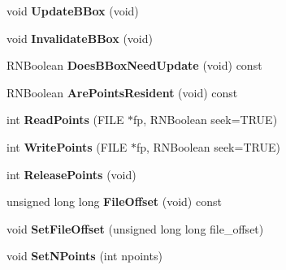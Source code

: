 \begin{DoxyCompactItemize}
\item 
void {\bfseries Update\+B\+Box} (void)\hypertarget{class_g_s_v_scanline_a765a0175e7e921746ac149bc28713080}{}\label{class_g_s_v_scanline_a765a0175e7e921746ac149bc28713080}

\item 
void {\bfseries Invalidate\+B\+Box} (void)\hypertarget{class_g_s_v_scanline_ab61db4a29fb886aecb4a9addae172924}{}\label{class_g_s_v_scanline_ab61db4a29fb886aecb4a9addae172924}

\item 
R\+N\+Boolean {\bfseries Does\+B\+Box\+Need\+Update} (void) const \hypertarget{class_g_s_v_scanline_a3423f23e7389a018947f7025e388a76a}{}\label{class_g_s_v_scanline_a3423f23e7389a018947f7025e388a76a}

\item 
R\+N\+Boolean {\bfseries Are\+Points\+Resident} (void) const \hypertarget{class_g_s_v_scanline_aa938da08127d408403f0c01de9ec17fe}{}\label{class_g_s_v_scanline_aa938da08127d408403f0c01de9ec17fe}

\item 
int {\bfseries Read\+Points} (F\+I\+LE $\ast$fp, R\+N\+Boolean seek=T\+R\+UE)\hypertarget{class_g_s_v_scanline_a68724c90e93ad9b6da8956a2a0b12c3a}{}\label{class_g_s_v_scanline_a68724c90e93ad9b6da8956a2a0b12c3a}

\item 
int {\bfseries Write\+Points} (F\+I\+LE $\ast$fp, R\+N\+Boolean seek=T\+R\+UE)\hypertarget{class_g_s_v_scanline_a57c52f24fdd3ab0359be442d44e754bd}{}\label{class_g_s_v_scanline_a57c52f24fdd3ab0359be442d44e754bd}

\item 
int {\bfseries Release\+Points} (void)\hypertarget{class_g_s_v_scanline_a54d623f885d6435dc6a5f180d48ed27e}{}\label{class_g_s_v_scanline_a54d623f885d6435dc6a5f180d48ed27e}

\item 
unsigned long long {\bfseries File\+Offset} (void) const \hypertarget{class_g_s_v_scanline_a451500185268074267e500a79319407a}{}\label{class_g_s_v_scanline_a451500185268074267e500a79319407a}

\item 
void {\bfseries Set\+File\+Offset} (unsigned long long file\+\_\+offset)\hypertarget{class_g_s_v_scanline_ab7cb57809097339ae15ffdece632abdf}{}\label{class_g_s_v_scanline_ab7cb57809097339ae15ffdece632abdf}

\item 
void {\bfseries Set\+N\+Points} (int npoints)\hypertarget{class_g_s_v_scanline_a463c6985c8bad8270f617e773bd930cf}{}\label{class_g_s_v_scanline_a463c6985c8bad8270f617e773bd930cf}

\end{DoxyCompactItemize}
